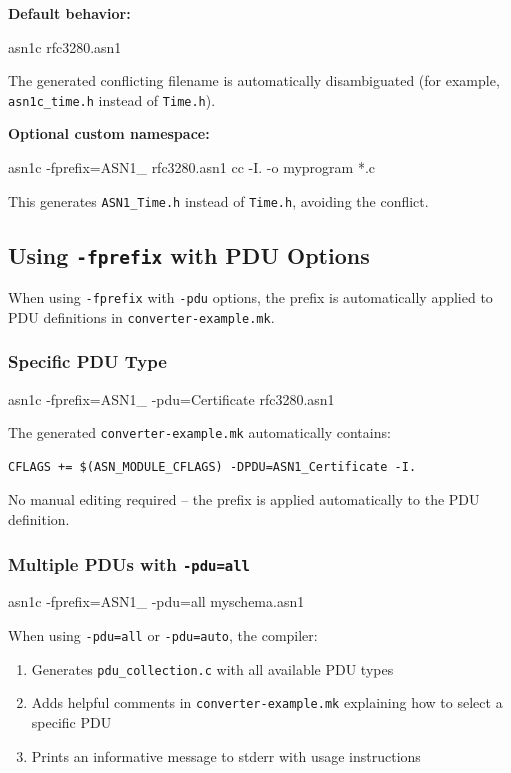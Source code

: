 \documentclass[english,oneside,12pt]{book}
\begin{document}
\textbf{Default behavior:}
\begin{bash}
asn1c rfc3280.asn1
\end{bash}
The generated conflicting filename is automatically disambiguated (for example,
\texttt{asn1c\_time.h} instead of \texttt{Time.h}).

\textbf{Optional custom namespace:}
\begin{bash}
asn1c -fprefix=ASN1_ rfc3280.asn1
cc -I. -o myprogram *.c
\end{bash}

This generates \texttt{ASN1\_Time.h} instead of \texttt{Time.h}, avoiding the conflict.

\subsection*{Using \texttt{-fprefix} with PDU Options}

When using \texttt{-fprefix} with \texttt{-pdu} options, the prefix is automatically 
applied to PDU definitions in \texttt{converter-example.mk}.

\subsubsection*{Specific PDU Type}

\begin{bash}
asn1c -fprefix=ASN1_ -pdu=Certificate rfc3280.asn1
\end{bash}

The generated \texttt{converter-example.mk} automatically contains:
\begin{verbatim}
CFLAGS += $(ASN_MODULE_CFLAGS) -DPDU=ASN1_Certificate -I.
\end{verbatim}

No manual editing required -- the prefix is applied automatically to the PDU definition.

\subsubsection*{Multiple PDUs with \texttt{-pdu=all}}

\begin{bash}
asn1c -fprefix=ASN1_ -pdu=all myschema.asn1
\end{bash}

When using \texttt{-pdu=all} or \texttt{-pdu=auto}, the compiler:
\begin{enumerate}
\item Generates \texttt{pdu\_collection.c} with all available PDU types
\item Adds helpful comments in \texttt{converter-example.mk} explaining how to select a specific PDU
\item Prints an informative message to stderr with usage instructions
\end{enumerate}
\end{document}
